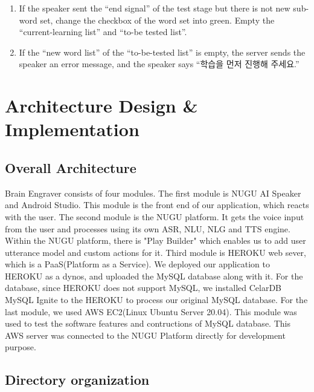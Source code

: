 \documentclass[conference]{IEEEtran}
\begin{document}
\begin{enumerate}
\begin{enumerate}
\begin{enumerate}
            \item If the speaker sent the “end signal” of the test stage but there is not new sub-word set, change the checkbox of the word set into green. Empty the “current-learning list” and “to-be tested list”.
            \item If the “new word list” of the “to-be-tested list” is empty, the server sends the speaker an error message, and the speaker says “학습을 먼저 진행해 주세요.”
        \end{enumerate} 
    \end{enumerate}
\end{enumerate}






\section{Architecture Design \& Implementation}
    \subsection{Overall Architecture}
Brain Engraver consists of four modules. The first module is NUGU AI Speaker and Android Studio. This module is the front end of our application, which reacts with the user. The second module is the NUGU platform. It gets the voice input from the user and processes using its own ASR, NLU, NLG and TTS engine. Within the NUGU platform, there is "Play Builder" which enables us to add user utterance model and custom actions for it. Third module is HEROKU web sever, which is a PaaS(Platform as a Service). We deployed our application to HEROKU as a dynos, and uploaded the MySQL database along with it. For the database, since HEROKU does not support MySQL, we installed CelarDB MySQL Ignite to the HEROKU to process our original MySQL database. For the last module, we used AWS EC2(Linux Ubuntu Server 20.04). This module was used to test the software features and contructions of MySQL database. This AWS server was connected to the NUGU Platform directly for development purpose.

    \subsection{Directory organization}
\end{document}
